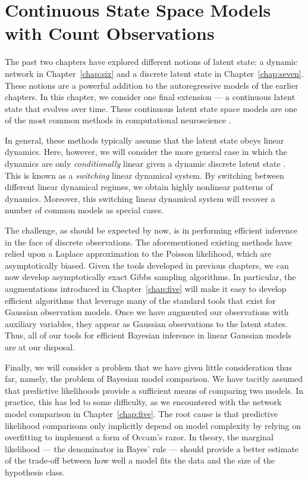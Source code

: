 \chapter{Continuous State Space Models with Count Observations}
\label{chap:eight}

The past two chapters have explored different notions of latent
state: a dynamic network in Chapter~\ref{chap:six} and a discrete
latent state in Chapter~\ref{chap:seven}. These notions are a powerful
addition to the autoregressive models of the earlier chapters. In
this chapter, we consider one final extension --- a continuous
latent state that evolves over time. These continuous latent state
space models are one of the most common methods in computational
neuroscience \citep{Smith-2003, paninski2010new, macke2011empirical,
  Buesing12, Petreska-2011, cunningham2014dimensionality}.

In general, these methods typically assume that the latent state obeys
linear dynamics. Here, however, we will consider the more general case
in which the dynamics are only \emph{conditionally} linear given a
dynamic discrete latent state \citep{Petreska-2011}.  This is known as
a \emph{switching} linear dynamical system.  By switching between
different linear dynamical regimes, we obtain highly nonlinear
patterns of dynamics. Moreover, this switching linear dynamical system
will recover a number of common models as special cases.

The challenge, as should be expected by now, is in performing
efficient inference in the face of discrete observations. The
aforementioned existing methods have relied upon a Laplace
approximation to the Poisson likelihood, which are asymptotically
biased. Given the tools developed in previous chapters, we can now
develop asymptotically exact Gibbs sampling algorithms. In particular,
the \polyagamma augmentations introduced in Chapter~\ref{chap:five}
will make it easy to develop efficient algorithms that leverage many
of the standard tools that exist for Gaussian observation models. Once
we have augmented our observations with \polyagamma auxiliary
variables, they appear as Gaussian observations to the latent
states. Thus, all of our tools for efficient Bayesian inference in
linear Gaussian models are at our disposal.

Finally, we will consider a problem that we have given little
consideration thus far, namely, the problem of Bayesian model
comparison.  We have tacitly assumed that predictive likelihoods
provide a sufficient means of comparing two models. In practice, this
has led to some difficulty, as we encountered with the network model
comparison in Chapter~\ref{chap:five}. The root cause is that
predictive likelihood comparisons only implicitly depend on model
complexity by relying on overfitting to implement a form of Occam's
razor.  In theory, the marginal likelihood --- the denominator in
Bayes' rule --- should provide a better estimate of the trade-off
between how well a model fits the data and the size of the hypothesis
class.

